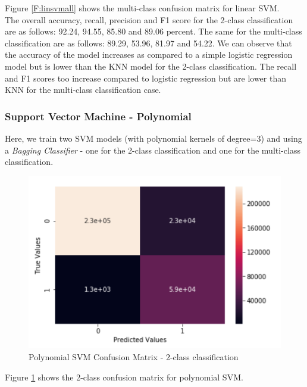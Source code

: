 Figure \ref{F:linsvmall} shows the multi-class confusion matrix for linear SVM.\\
The overall accuracy, recall, precision and F1 score for the 2-class classification are as follows: 92.24, 94.55, 85.80 and 89.06 percent. The same for the multi-class classification are as follows: 89.29, 53.96, 81.97 and 54.22. We can observe that the accuracy of the model increases as compared to a simple logistic regression model but is lower than the KNN model for the 2-class classification. The recall and F1 scores too increase compared to logistic regression but are lower than KNN for the multi-class classification case.

\subsubsection{Support Vector Machine - Polynomial}
Here, we train two SVM models (with polynomial kernels of degree=3) and using a {\em Bagging Classifier} - one for the 2-class classification and one for the multi-class classification. 
\begin{figure}
	\includegraphics[width=1.0\columnwidth]{images/svmpoly2.PNG}
	\caption{Polynomial SVM Confusion Matrix - 2-class classification}
	\label{F:polysvm2}
\end{figure}
Figure \ref{F:polysvm2} shows the 2-class confusion matrix for polynomial SVM.
